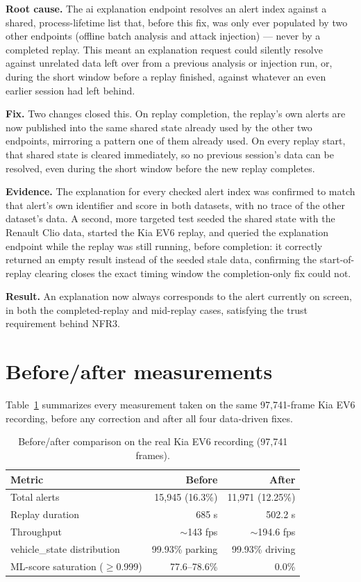 \textbf{Root cause.} The \gls{ai} explanation endpoint resolves an alert index against a shared, process-lifetime list that, before this fix, was only ever populated by two other endpoints (offline batch analysis and attack injection) — never by a completed replay. This meant an explanation request could silently resolve against unrelated data left over from a previous analysis or injection run, or, during the short window before a replay finished, against whatever an even earlier session had left behind.

\textbf{Fix.} Two changes closed this. On replay completion, the replay's own alerts are now published into the same shared state already used by the other two endpoints, mirroring a pattern one of them already used. On every replay start, that shared state is cleared immediately, so no previous session's data can be resolved, even during the short window before the new replay completes.

\textbf{Evidence.} The explanation for every checked alert index was confirmed to match that alert's own identifier and score in both datasets, with no trace of the other dataset's data. A second, more targeted test seeded the shared state with the Renault Clio data, started the Kia EV6 replay, and queried the explanation endpoint while the replay was still running, before completion: it correctly returned an empty result instead of the seeded stale data, confirming the start-of-replay clearing closes the exact timing window the completion-only fix could not.

\textbf{Result.} An explanation now always corresponds to the alert currently on screen, in both the completed-replay and mid-replay cases, satisfying the trust requirement behind NFR3.

\section{Before/after measurements}
\label{sec:validation-beforeafter}

Table~\ref{tab:before-after} summarizes every measurement taken on the same 97{,}741-frame Kia EV6 recording, before any correction and after all four data-driven fixes.

\begin{table}[H]
\centering
\caption{Before/after comparison on the real Kia EV6 recording (97,741 frames).}
\label{tab:before-after}
\begin{tabular}{|l|r|r|}
\hline
\textbf{Metric} & \textbf{Before} & \textbf{After} \\
\hline
Total alerts               & 15{,}945 (16.3\%) & 11{,}971 (12.25\%) \\
\hline
Replay duration            & 685 s              & 502.2 s \\
\hline
Throughput                 & $\sim$143 fps       & $\sim$194.6 fps \\
\hline
vehicle\_state distribution & 99.93\% parking & 99.93\% driving \\
\hline
ML-score saturation ($\geq$0.999) & 77.6--78.6\%   & 0.0\% \\
\hline
\end{tabular}
\end{table}


